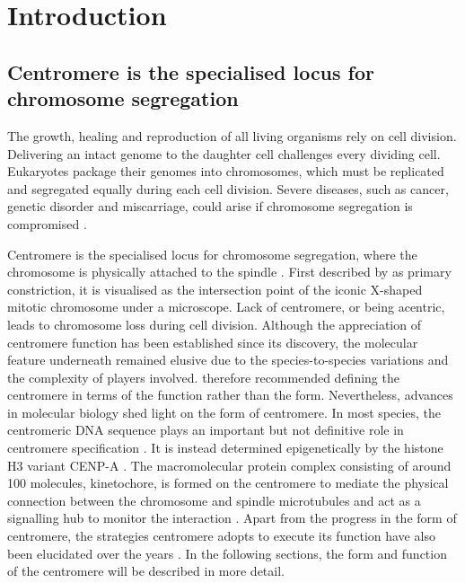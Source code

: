 \chapter{Introduction}
\section{Centromere is the specialised locus for chromosome segregation}

 The growth, healing and reproduction of all living organisms rely on cell division. Delivering an intact genome to the daughter cell challenges every dividing cell. Eukaryotes package their genomes into chromosomes, which must be replicated and segregated equally during each cell division. Severe diseases, such as cancer, genetic disorder and miscarriage, could arise if chromosome segregation is compromised \citep{Jallepalli2001ChromosomeMystery, Draviam2004ChromosomeStability, Wasielak-Politowska2022ChromosomeAging, Losada2014CohesinBeyond}. 
 
 Centromere is the specialised locus for chromosome segregation, where the chromosome is physically attached to the spindle \citep{Westhorpe2015AMaintenance, McKinley2015TheFunction, Talbert2020WhatCentromere, Fukagawa2014}. First described by \cite{Flemming1882ZellsubstanzZelltheilung} as primary constriction, it is visualised as the intersection point of the iconic X-shaped mitotic chromosome under a microscope. Lack of centromere, or being acentric, leads to chromosome loss during cell division. Although the appreciation of centromere function has been established since its discovery, the molecular feature underneath remained elusive due to the species-to-species variations and the complexity of players involved. \cite{Darlington1936TheEnquiry} therefore recommended defining the centromere in terms of the function rather than the form. Nevertheless, advances in molecular biology shed light on the form of centromere. In most species, the centromeric DNA sequence plays an important but not definitive role in centromere specification \citep{Hoffmann2020, Harrington1997FormationMicrochromosomes, Catania2015SequenceChromatin, Iwata-Otsubo2017, Kasinathan2018Non-B-FormCentromeres, Shukla2018CentromereCycle, Logsdon2019, Murillo-Pineda2020}. It is instead determined epigenetically by the histone H3 variant CENP-A \citep{Warburton1997ImmunolocalizationCentromeres, Vafa1997ChromatinPlate, Earnshaw1985ThreeChromosome, Liu2006MappingCells, Regnier2005CENP-ABubR1, Heun2006, Mendiburo2011, Barnhart2011, Logsdon2015}. The macromolecular protein complex consisting of around 100 molecules, kinetochore, is formed on the centromere to mediate the physical connection between the chromosome and spindle microtubules and act as a signalling hub to monitor the interaction \citep{Musacchio2017AFunction, McAinsh2022TheKinetochores, Cheeseman2014TheKinetochore, Hara2018KinetochoreExit}. Apart from the progress in the form of centromere, the strategies centromere adopts to execute its function have also been elucidated over the years \citep{Tanaka2013, Zhou2020EmergentChromosomes}. In the following sections, the form and function of the centromere will be described in more detail. 

